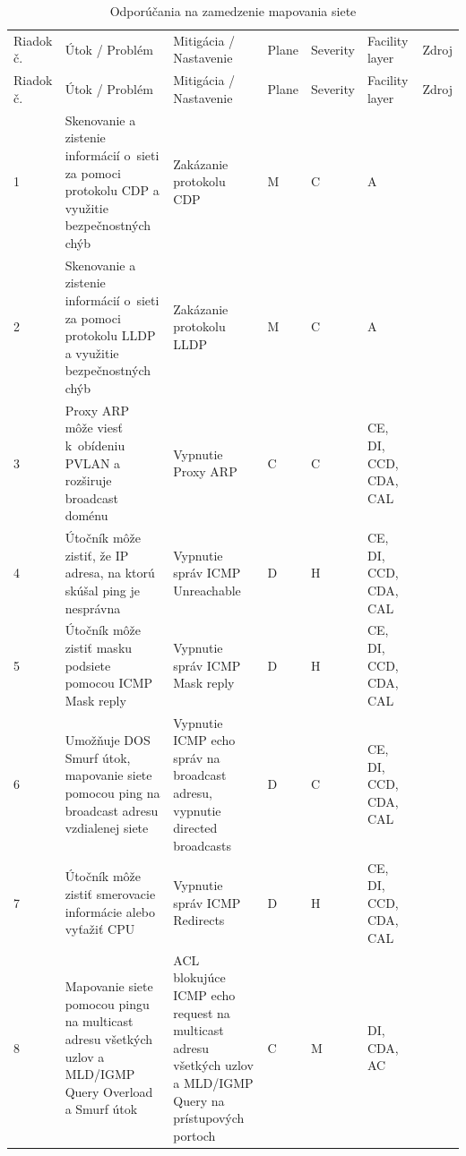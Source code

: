 \begin{longtable}[!htbp]{|C{2.5em}L{11em}L{11em}C{2.5em}C{4em}C{5em}L{2.5em}|}
	\caption{Odporúčania na zamedzenie mapovania siete}
	\label{tab:mapping}\\ \hline
	\mbox{Riadok} č.&Útok / Problém	&Mitigácia / Nastavenie	&Plane	&Severity	&Facility layer	&Zdroj\\ \hhline{=======}
	\endfirsthead 
	\hline
	\centering
	
	Riadok č.	&Útok / Problém	&Mitigácia / Nastavenie	&Plane	&Severity	&Facility layer	&Zdroj\\ \hhline{=======}
	\endhead
	
	 1	&Skenovanie a zistenie informácií o~sieti za pomoci protokolu CDP a využitie bezpečnostných chýb	&Zakázanie protokolu CDP	&M	&C	&A	& \cite{CIS_DrTLsgXv24lxeIIM}
	
	\cite{Graesser2001}\\
	2	&Skenovanie a zistenie informácií o~sieti za pomoci protokolu LLDP a využitie bezpečnostných chýb	&Zakázanie protokolu LLDP	&M	&C	&A	& \cite{McMillan2018}\\
	 3	&Proxy ARP môže viesť k~obídeniu PVLAN a rozširuje broadcast doménu	&Vypnutie Proxy ARP	&C	&C	&CE,
	DI,
	CCD,
	CDA,
	CAL	& \cite{CIS_DrTLsgXv24lxeIIM}
	
	\cite{Graesser2001}\\
	4	&Útočník môže zistiť, že IP adresa, na ktorú skúšal ping je nesprávna	&Vypnutie správ ICMP Unreachable	&D	&H	&CE,
	DI,
	CCD,
	CDA,
	CAL	& \cite{Singh2018}
	\\
	 5	&Útočník môže zistiť masku podsiete pomocou ICMP Mask reply	&Vypnutie správ ICMP Mask reply	&D	&H	&CE,
	DI,
	CCD,
	CDA,
	CAL	& \cite{Akin2002}
	\\
	6	&Umožňuje DOS Smurf útok, mapovanie siete pomocou ping na broadcast adresu vzdialenej siete	&Vypnutie ICMP echo správ na broadcast adresu, vypnutie directed broadcasts	&D	&C	&CE,
	DI,
	CCD,
	CDA,
	CAL	& \cite{Graesser2001}
	
	\cite{Akin2002}
	\\
	 7	&Útočník môže zistiť smerovacie informácie alebo vyťažiť CPU	&Vypnutie správ ICMP Redirects	&D	&H	&CE,
	DI,
	CCD,
	CDA,
	CAL	& \cite{Singh2018}
	\\
	8	&Mapovanie siete pomocou pingu na multicast adresu všetkých uzlov a MLD/IGMP Query Overload a Smurf útok	& ACL blokujúce ICMP echo request na multicast adresu všetkých uzlov a MLD/IGMP Query na prístupových portoch	&C	&M	&DI,
	CDA,
	AC	&\cite{Podermanski532015}
	
	\cite{Rey2016}\\
	\hline
\end{longtable}%
